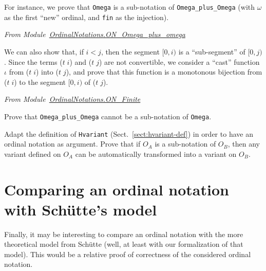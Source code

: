 For instance, we prove that \texttt{Omega} is a sub-notation of
\texttt{Omega\_plus\_Omega} (with $\omega$ as the first ``new'' ordinal, and \texttt{fin} as the injection).

\vspace{10pt}

\noindent\emph{From Module~\href{../theories/html/hydras.OrdinalNotations.ON_Omega_plus_omega.html}{OrdinalNotations.ON\_Omega\_plus\_omega}}



We can also show that, if $i<j$, then the segment $[0,i)$ is a ``sub-segment'' of
$[0,j)$. Since the terms  ($t\;i$) and ($t\;j$) are not convertible, we consider a ``cast'' 
function $\iota$ from ($t\;i$) into ($t\;j$), and prove that this function is  a monotonous bijection  from ($t\;i$) to
the segment $[0,i)$ of ($t\;j$).


\vspace{10pt}

\noindent\emph{From Module~\href{../theories/html/hydras.OrdinalNotations.ON_Finite.html}{OrdinalNotations.ON\_Finite}}





\begin{exercise}
Prove that \texttt{Omega\_plus\_Omega} cannot be a sub-notation of \texttt{Omega}.
\end{exercise}

\begin{project}
Adapt the definition of \texttt{Hvariant} (Sect.~\ref{sect:hvariant-def}) in order to
have an ordinal notation as argument. Prove that if $O_A$ is a sub-notation of $O_B$, then any variant defined on  $O_A$ can be automatically transformed into 
a variant on $O_B$.
\end{project}




\section{Comparing an ordinal notation with Schütte's model}

Finally, it may be interesting to compare an ordinal notation with the more theoretical model from Schütte (well, at least with our formalization of that model). This would be a relative proof of correctness of the considered  ordinal  notation.

